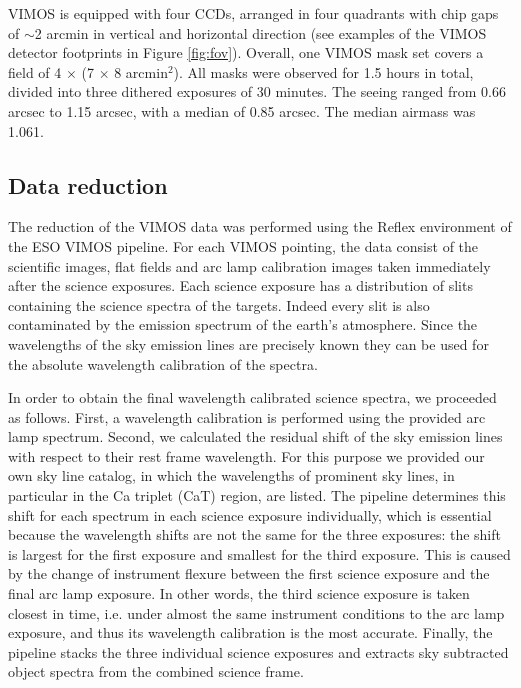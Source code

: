 \documentclass[usenatbib]{mnras}
\begin{document}
VIMOS is equipped with four CCDs, arranged in four quadrants with chip gaps of 
$\sim$2 arcmin in vertical and horizontal direction (see examples of the VIMOS 
detector footprints in Figure \ref{fig:fov}). Overall, one VIMOS mask set 
covers a field of 4 $\times$ (7 $\times$ 8 arcmin$^2$). All masks were observed 
for 1.5 hours in total, divided into three dithered exposures of 30 minutes. 
The seeing ranged from 0.66 arcsec to 1.15 arcsec, with a median of 0.85 arcsec. 
The median airmass was 1.061. 

\subsection{Data reduction}

The reduction of the VIMOS data was performed using the Reflex 
environment \citep{Freudling13} of the ESO VIMOS pipeline. 
For each VIMOS pointing, the data consist of the scientific images, flat fields and
arc lamp calibration images taken immediately after the science 
exposures. Each science exposure has a distribution of slits containing the 
science spectra of the targets. Indeed every slit is also contaminated by the 
emission spectrum of the earth's atmosphere. Since the wavelengths of the 
sky emission lines are precisely known they can be used for the absolute 
wavelength calibration of the spectra.

In order to obtain the final wavelength calibrated science spectra, we 
proceeded as follows. First, a wavelength calibration 
is performed using the provided arc lamp spectrum. Second, we calculated the residual 
shift of the sky emission lines with respect to their rest frame wavelength. 
For this purpose we provided our own sky line catalog, in which 
the wavelengths of prominent sky lines, in particular in the Ca triplet (CaT)
region, are listed. The pipeline determines this shift for each spectrum in 
each science exposure individually, which is essential because the wavelength 
shifts are not the same for the three exposures: the shift is largest for the 
first exposure and smallest for the third exposure. This 
is caused by the 
change of instrument flexure between the first science exposure and the final 
arc lamp exposure. In other words, the third science exposure is taken 
closest in time, i.e. under almost the same instrument conditions to the arc 
lamp exposure, and thus its wavelength calibration is the most accurate. 
Finally, the pipeline stacks the three individual science exposures and 
extracts sky subtracted object spectra from the combined science frame.
\end{document}
